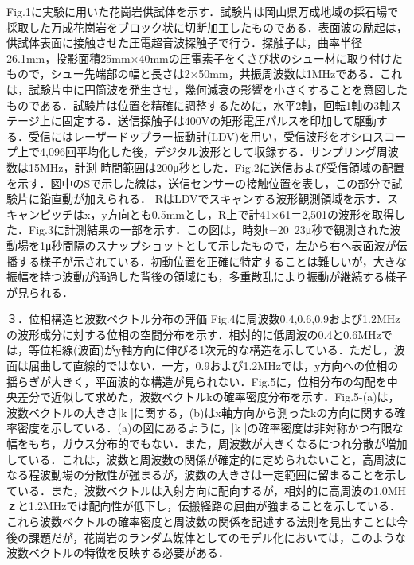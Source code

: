 ﻿%
Fig.1に実験に用いた花崗岩供試体を示す．試験片は岡山県万成地域の採石場で採取した万成花崗岩をブロック状に切断加工したものである．表面波の励起は，供試体表面に接触させた圧電超音波探触子で行う．探触子は，曲率半径26.1mm，投影面積25mm×40mmの圧電素子をくさび状のシュー材に取り付けたもので，シュー先端部の幅と長さは2×50mm，共振周波数は1MHzである．これは，試験片中に円筒波を発生させ，幾何減衰の影響を小さくすることを意図したものである．試験片は位置を精確に調整するために，水平2軸，回転1軸の3軸ステージ上に固定する．送信探触子は400Vの矩形電圧パルスを印加して駆動する．受信にはレーザードップラー振動計(LDV)を用い，受信波形をオシロスコープ上で4,096回平均化した後，デジタル波形として収録する．サンプリング周波数は15MHz，計測
時間範囲は200μ秒とした．Fig.2に送信および受信領域の配置を示す．図中のSで示した線は，送信センサーの接触位置を表し，この部分で試験片に鉛直動が加えられる． RはLDVでスキャンする波形観測領域を示す．スキャンピッチはx，y方向とも0.5mmとし，R上で計41×61＝2,501の波形を取得した．Fig.3に計測結果の一部を示す．この図は，時刻t=20~23μ秒で観測された波動場を1μ秒間隔のスナップショットとして示したもので，左から右へ表面波が伝播する様子が示されている．初動位置を正確に特定することは難しいが，大きな振幅を持つ波動が通過した背後の領域にも，多重散乱により振動が継続する様子が見られる．

３．位相構造と波数ベクトル分布の評価
Fig.4に周波数0.4,0.6,0.9および1.2MHzの波形成分に対する位相の空間分布を示す．相対的に低周波の0.4と0.6MHzでは，等位相線(波面)がy軸方向に伸びる1次元的な構造を示している．ただし，波面は屈曲して直線的ではない．一方，0.9および1.2MHzでは，y方向への位相の揺らぎが大きく，平面波的な構造が見られない．Fig.5に，位相分布の勾配を中央差分で近似して求めた，波数ベクトルkの確率密度分布を示す．Fig.5-(a)は，波数ベクトルの大きさ|k |に関する，(b)はx軸方向から測ったkの方向に関する確率密度を示している．(a)の図にあるように，|k |の確率密度は非対称かつ有限な幅をもち，ガウス分布的でもない．また，周波数が大きくなるにつれ分散が増加している．これは，波数と周波数の関係が確定的に定められないこと，高周波になる程波動場の分散性が強まるが，波数の大きさは一定範囲に留まることを示している．また，波数ベクトルは入射方向に配向するが，相対的に高周波の1.0MHｚと1.2MHzでは配向性が低下し，伝搬経路の屈曲が強まることを示している．これら波数ベクトルの確率密度と周波数の関係を記述する法則を見出すことは今後の課題だが，花崗岩のランダム媒体としてのモデル化においては，このような波数ベクトルの特徴を反映する必要がある．

